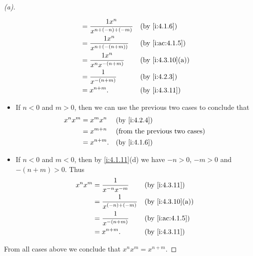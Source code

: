 \begin{proof}[(a)]
\begin{itemize}
\begin{align*}
                    & = \dfrac{1 x^n}{x^{n + (-n) + (-m)}} &  & \by{i:4.1.6}     \\
                    & = \dfrac{1 x^n}{x^{n + (-(n + m))}}  &  & \by{i:ac:4.1.5}  \\
                    & = \dfrac{1 x^n}{x^n x^{-(n + m)}}    &  & \by{i:4.3.10}[a] \\
                    & = \dfrac{1}{x^{-(n + m)}}            &  & \by{i:4.2.3}     \\
                    & = x^{n + m}.                         &  & \by{i:4.3.11}
          \end{align*}
    \item If \(n < 0\) and \(m > 0\), then we can use the previous two cases to conclude that
          \begin{align*}
            x^n x^m & = x^m x^n    &  & \by{i:4.2.4}                         \\
                    & = x^{m + n}  &  & \text{(from the previous two cases)} \\
                    & = x^{n + m}. &  & \by{i:4.1.6}
          \end{align*}
    \item If \(n < 0\) and \(m < 0\), then by \cref{i:4.1.11}(d) we have \(-n > 0\), \(-m > 0\) and \(-(n + m) > 0\).
          Thus
          \begin{align*}
            x^n x^m & = \dfrac{1}{x^{-n} x^{-m}}   &  & \by{i:4.3.11}    \\
                    & = \dfrac{1}{x^{(-n) + (-m)}} &  & \by{i:4.3.10}[a] \\
                    & = \dfrac{1}{x^{-(n + m)}}    &  & \by{i:ac:4.1.5}  \\
                    & = x^{n + m}.                 &  & \by{i:4.3.11}
          \end{align*}
  \end{itemize}
  From all cases above we conclude that \(x^n x^m = x^{n + m}\).


\end{proof}
